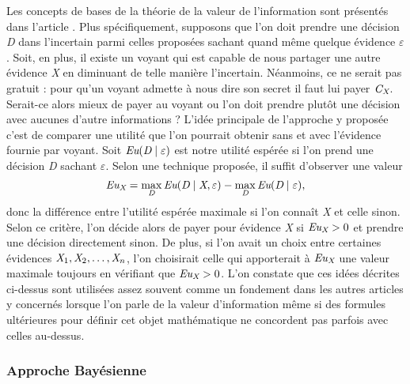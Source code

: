\documentclass[a4paper,11pt]{article}
\theoremstyle{plain}
\begin{document}
Les concepts de bases de la théorie de la valeur de l’information sont présentés dans l’article \cite{howard_information_1966}. Plus spécifiquement, supposons que l’on doit prendre une décision \emph{D} dans l’incertain parmi celles proposées sachant quand même quelque évidence $\varepsilon$. Soit, en plus, il existe un voyant qui est capable de nous partager une autre évidence \emph{X} en diminuant de telle manière l’incertain. Néanmoins, ce ne serait pas gratuit : pour qu’un voyant admette à nous dire son secret il faut lui payer $\emph{C}_\emph{X}$. Serait-ce alors mieux de payer au voyant ou l’on doit prendre plutôt une décision avec aucunes d’autre informations ? L’idée principale de l’approche y proposée c’est de comparer une utilité que l’on pourrait obtenir sans et avec l’évidence fournie par voyant. Soit $\emph{Eu}(\emph{D} \mid \varepsilon)$ est notre utilité espérée si l’on prend une décision \emph{D} sachant $\varepsilon$. Selon une technique proposée, il suffit d’observer une valeur
\[\emph{Eu}_{\emph{X}} =\max_{\emph{D}} \emph{Eu}(\emph{D} \mid \emph{X}, \varepsilon) - \max_{\emph{D}} \emph{Eu}(\emph{D} \mid \varepsilon),\]
donc la différence entre l’utilité espérée maximale si l’on connaît \emph{X} et celle sinon. Selon ce critère, l’on décide alors de payer pour évidence \emph{X} si $\emph{Eu}_\emph{X} > 0$ et prendre une décision directement sinon. De plus, si l’on avait un choix entre certaines évidences $\emph{X}_1, \emph{X}_2, \dotsc, \emph{X}_n$, l’on choisirait celle qui apporterait à $\emph{Eu}_\emph{X}$ une valeur maximale toujours en vérifiant que $\emph{Eu}_\emph{X} > 0$.
L’on constate que ces idées décrites ci-dessus sont utilisées assez souvent comme un fondement dans les autres articles y concernés lorsque l’on parle de la valeur d’information même si des formules ultérieures pour définir cet objet mathématique ne concordent pas parfois avec celles au-dessus.

\subsubsection{Approche Bayésienne}
\end{document}
